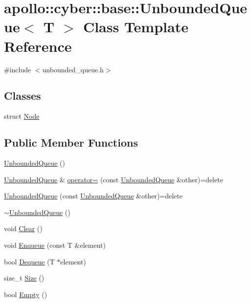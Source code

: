 \hypertarget{classapollo_1_1cyber_1_1base_1_1UnboundedQueue}{\section{apollo\-:\-:cyber\-:\-:base\-:\-:Unbounded\-Queue$<$ T $>$ Class Template Reference}
\label{classapollo_1_1cyber_1_1base_1_1UnboundedQueue}
}


{\ttfamily \#include $<$unbounded\-\_\-queue.\-h$>$}

\subsection*{Classes}
\begin{DoxyCompactItemize}
\item 
struct \hyperlink{structapollo_1_1cyber_1_1base_1_1UnboundedQueue_1_1Node}{Node}
\end{DoxyCompactItemize}
\subsection*{Public Member Functions}
\begin{DoxyCompactItemize}
\item 
\hyperlink{classapollo_1_1cyber_1_1base_1_1UnboundedQueue_a4ed05702de2a1380547b9db09439ca86}{Unbounded\-Queue} ()
\item 
\hyperlink{classapollo_1_1cyber_1_1base_1_1UnboundedQueue}{Unbounded\-Queue} \& \hyperlink{classapollo_1_1cyber_1_1base_1_1UnboundedQueue_a9121ebd82ee007ec07d9bc7ab201f00a}{operator=} (const \hyperlink{classapollo_1_1cyber_1_1base_1_1UnboundedQueue}{Unbounded\-Queue} \&other)=delete
\item 
\hyperlink{classapollo_1_1cyber_1_1base_1_1UnboundedQueue_a3ee4d400be23a70630a08487abef1f2c}{Unbounded\-Queue} (const \hyperlink{classapollo_1_1cyber_1_1base_1_1UnboundedQueue}{Unbounded\-Queue} \&other)=delete
\item 
\hyperlink{classapollo_1_1cyber_1_1base_1_1UnboundedQueue_aa2801eb47524124080686b11a207a074}{$\sim$\-Unbounded\-Queue} ()
\item 
void \hyperlink{classapollo_1_1cyber_1_1base_1_1UnboundedQueue_a4fae8d8e2b261d505a303086e3907bf6}{Clear} ()
\item 
void \hyperlink{classapollo_1_1cyber_1_1base_1_1UnboundedQueue_a449aa1a73e6a33cd8e1a5506fc2b2334}{Enqueue} (const T \&element)
\item 
bool \hyperlink{classapollo_1_1cyber_1_1base_1_1UnboundedQueue_a59dfffdb79da27f745c2bf067190d360}{Dequeue} (T $\ast$element)
\item 
size\-\_\-t \hyperlink{classapollo_1_1cyber_1_1base_1_1UnboundedQueue_a3eb8bea3e74d61667516d5984288a4d8}{Size} ()
\item 
bool \hyperlink{classapollo_1_1cyber_1_1base_1_1UnboundedQueue_a7ba37a0f3d6c5b6c7a9f8881af947635}{Empty} ()
\end{DoxyCompactItemize}
